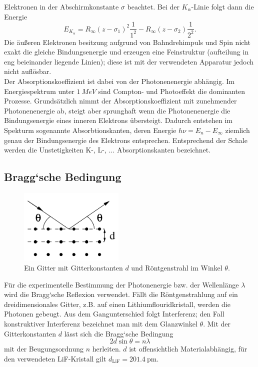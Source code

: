 Elektronen in der Abschirmkonstante $\sigma$ beachtet. Bei der $K_\alpha$-Linie folgt dann
die Energie
\begin{equation}
	E_{K_\alpha} = R_\infty (z - \sigma_1)^2 \frac{1}{1^2} - R_\infty (z - \sigma_2)
	\frac{1}{2^2}.
\end{equation}
Die äußeren Elektronen besitzung aufgrund von Bahndrehimpuls und Spin nicht exakt die
gleiche Bindungsenergie und erzeugen eine Feinstruktur (aufteilung in eng beieinander
liegende Linien); diese ist mit der verwendeten Apparatur jedoch nicht auflösbar.
\\
Der Absorptionskoeffizient ist dabei von der Photonenenergie abhängig. Im Energiespektrum
unter $\SI{1}{MeV}$ sind Compton- und Photoeffekt die dominanten Prozesse. Grundsätzlich
nimmt der Absorptionskoeffizient mit zunehmender Photonenenergie ab, steigt aber
sprunghaft wenn die Photonenenergie die Bindungsenergie eines inneren Elektrons
übersteigt. Dadurch entstehen im Spekturm sogenannte Absorbtionskanten, deren Energie
$h\nu = E_n - E_\infty$ ziemlich genau der Bindungsenergie des Elektrons entsprechen.
Entsprechend der Schale werden die Unstetigkeiten K-, L-, $\hdots$ Absorptionskanten
bezeichnet.

\subsection{Bragg`sche Bedingung}
\label{sec:Bragg`sche Bedingung}
\begin{figure}
	\begin{center}
		\includegraphics[width=5cm]{images/gitter.png}
	\caption{Ein Gitter mit Gitterkonstanten $d$ und Röntgenstrahl im Winkel
	$\theta$.}
	\end{center}
	\label{fig:gitter}
\end{figure}
Für die experimentelle Bestimmung der Photonenergie bzw. der Wellenlänge $\lambda$ wird
die Bragg`sche Reflexion verwendet. Fällt die Röntgenstrahlung auf ein
dreidimensionales Gitter, z.B. auf einen Lithiumflouridkristall, werden die Photonen
gebeugt. Aus dem Gangunterschied folgt Interferenz; den Fall konstruktiver Interferenz
bezeichnet man mit dem Glanzwinkel $\theta$. Mit der Gitterkonstanten $d$ lässt sich die
Bragg`sche Bedingung
\begin{equation}
	2d \sin\theta = n\lambda
	\label{eqn:braggsche-bedingung}
\end{equation}
mit der Beugungsordnung $n$ herleiten. $d$ ist offensichtlich Materialabhängig, für den
verwendeten LiF-Kristall gilt $d_\text{LiF} = \SI{201.4}{\pm}$.

